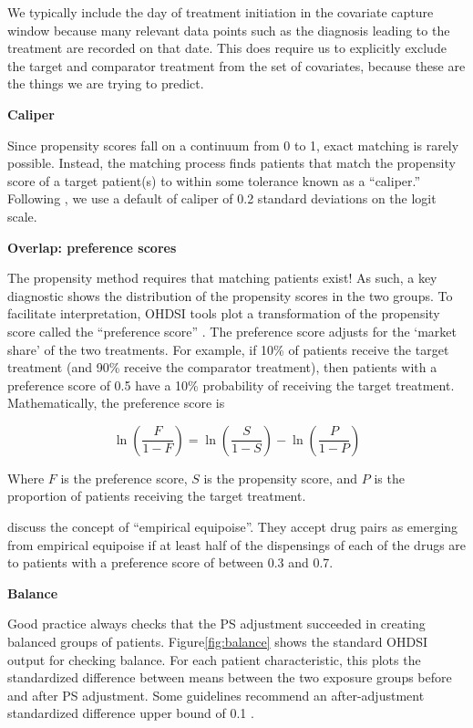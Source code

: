 \documentclass[11pt]{book}
\let\BeginKnitrBlock\begin \let\EndKnitrBlock\end
\begin{document}
\BeginKnitrBlock{rmdimportant}
We typically include the day of treatment initiation in the covariate
capture window because many relevant data points such as the diagnosis
leading to the treatment are recorded on that date. This does require us
to explicitly exclude the target and comparator treatment from the set
of covariates, because these are the things we are trying to predict.
\EndKnitrBlock{rmdimportant}

\textbf{Caliper}

Since propensity scores fall on a continuum from 0 to 1, exact matching
is rarely possible. Instead, the matching process finds patients that
match the propensity score of a target patient(s) to within some
tolerance known as a ``caliper.'' Following \citet{austin_2011}, we use
a default of caliper of 0.2 standard deviations on the logit scale.

\textbf{Overlap: preference scores}

The propensity method requires that matching patients exist! As such, a
key diagnostic shows the distribution of the propensity scores in the
two groups. To facilitate interpretation, OHDSI tools plot a
transformation of the propensity score called the ``preference score''
\citep{walker_2013}. The preference score adjusts for the `market share'
of the two treatments. For example, if 10\% of patients receive the
target treatment (and 90\% receive the comparator treatment), then
patients with a preference score of 0.5 have a 10\% probability of
receiving the target treatment. Mathematically, the preference score is

\[\ln\left(\frac{F}{1-F}\right)=\ln\left(\frac{S}{1-S}\right)-\ln\left(\frac{P}{1-P}\right)\]

Where \(F\) is the preference score, \(S\) is the propensity score, and
\(P\) is the proportion of patients receiving the target treatment.

\citet{walker_2013} discuss the concept of ``empirical equipoise''. They
accept drug pairs as emerging from empirical equipoise if at least half
of the dispensings of each of the drugs are to patients with a
preference score of between 0.3 and 0.7.

\textbf{Balance}

Good practice always checks that the PS adjustment succeeded in creating
balanced groups of patients. Figure\ref{fig:balance} shows the standard
OHDSI output for checking balance. For each patient characteristic, this
plots the standardized difference between means between the two exposure
groups before and after PS adjustment. Some guidelines recommend an
after-adjustment standardized difference upper bound of 0.1
\citep{rubin_2001}.
\end{document}
